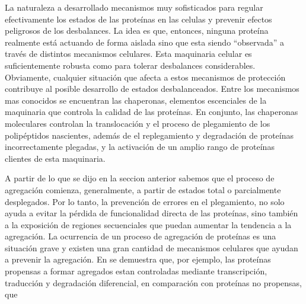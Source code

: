 La naturaleza a desarrollado mecanismos muy sofisticados para regular efectivamente los estados de las proteínas en las celulas y prevenir efectos peligrosos de los desbalances.
La idea es que, entonces, ninguna proteína realmente está actuando de forma aislada sino que esta siendo ``observada'' a través de distintos mecanismos celulares. 
Esta maquinaria celular es suficientemente robusta como para tolerar desbalances considerables.
Obviamente, cualquier situación que afecta a estos mecanismos de protección contribuye al posible desarrollo de estados desbalanceados.
Entre los mecanismos mas conocidos se encuentran las chaperonas, elementos escenciales de la maquinaria que controla la calidad de las proteínas.
En conjunto, las chaperonas moleculares controlan la translocación y el proceso de plegamiento de los polipéptidos nascientes, además de el replegamiento y degradación de proteínas incorrectamente plegadas, 
y la activación de un amplio rango de proteínas clientes de esta maquinaria.


A partir de lo que se dijo en la seccion anterior sabemos que el proceso de agregación comienza, generalmente, a partir de estados total o parcialmente desplegados. 
Por lo tanto, la prevención de errores en el plegamiento, no solo ayuda a evitar la pérdida de funcionalidad directa de las proteínas, sino también a la exposición de regiones secuenciales que puedan aumentar la tendencia a la agregación. 
La ocurrencia de un proceso de agregación de proteínas es una situación grave y existen una gran cantidad de mecanismos celulares que ayudan a prevenir la agregación.
En \cite{gsponer2012cellular} se demuestra que, por ejemplo, las proteínas propensas a formar agregados estan controladas mediante transcripción, traducción y degradación diferencial, en comparación con proteínas no propensas, 
que 


